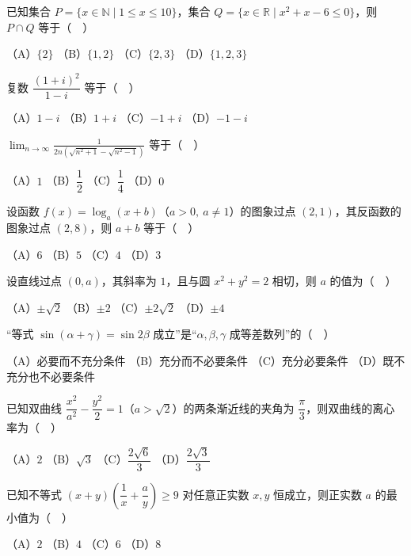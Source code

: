 \begin{question}
已知集合 \(P=\{x\in\mathbb N\mid 1\le x\le 10\}\)，集合 \(Q=\{x\in\mathbb R\mid x^2+x-6\le 0\}\)，则 \(P\cap Q\) 等于（　）

（A）\(\{2\}\)
（B）\(\{1,2\}\)
（C）\(\{2,3\}\)
（D）\(\{1,2,3\}\)

\end{question}
\begin{question}
复数 \(\dfrac{(1+i)^2}{1-i}\) 等于（　）

（A）\(1-i\)
（B）\(1+i\)
（C）\(-1+i\)
（D）\(-1-i\)

\end{question}
\begin{question}
\(\displaystyle \lim_{n\to\infty}\frac{1}{2n\left(\sqrt{n^2+1}-\sqrt{n^2-1}\right)}\) 等于（　）

（A）\(1\)
（B）\(\dfrac12\)
（C）\(\dfrac14\)
（D）\(0\)

\end{question}
\begin{question}
设函数 \(f(x)=\log_a(x+b)\)（\(a>0,\ a\ne1\)）的图象过点 \((2,1)\)，其反函数的图象过点 \((2,8)\)，则 \(a+b\) 等于（　）

（A）\(6\)
（B）\(5\)
（C）\(4\)
（D）\(3\)

\end{question}
\begin{question}
设直线过点 \((0,a)\)，其斜率为 \(1\)，且与圆 \(x^2+y^2=2\) 相切，则 \(a\) 的值为（　）

（A）\(\pm\sqrt2\)
（B）\(\pm2\)
（C）\(\pm2\sqrt2\)
（D）\(\pm4\)

\end{question}
\begin{question}
“等式 \(\sin(\alpha+\gamma)=\sin 2\beta\) 成立”是“\(\alpha,\beta,\gamma\) 成等差数列”的（　）

（A）必要而不充分条件
（B）充分而不必要条件
（C）充分必要条件
（D）既不充分也不必要条件

\end{question}
\begin{question}
已知双曲线 \(\dfrac{x^2}{a^2}-\dfrac{y^2}{2}=1\)（\(a>\sqrt2\)）的两条渐近线的夹角为 \(\dfrac\pi3\)，则双曲线的离心率为（　）

（A）\(2\)
（B）\(\sqrt3\)
（C）\(\dfrac{2\sqrt6}{3}\)
（D）\(\dfrac{2\sqrt3}{3}\)

\end{question}
\begin{question}
已知不等式 \((x+y)\left(\dfrac1x+\dfrac a y\right)\ge9\) 对任意正实数 \(x,y\) 恒成立，则正实数 \(a\) 的最小值为（　）

（A）\(2\)
（B）\(4\)
（C）\(6\)
（D）\(8\)

\end{question}
